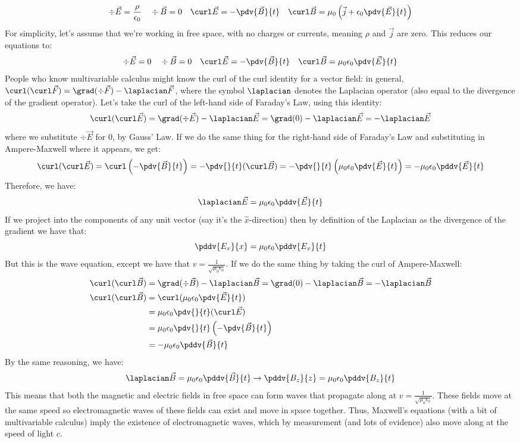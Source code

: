 \[
	\div \vec E = \frac{\rho}{\epsilon_0} \quad \div \vec B = 0 \quad \curl \vec E = -\pdv{\vec B}{t} \quad \curl \vec B = \mu_0 \left(\vec j + \epsilon_0 \pdv{\vec E}{t}\right)
\]
For simplicity, let's assume that we're working in free space, with no charges or currents, meaning $\rho$ and $\vec j$ are zero. This reduces our equations to:
\[
	\div \vec E = 0 \quad \div \vec B = 0 \quad \curl \vec E = -\pdv{\vec B}{t} \quad \curl \vec B = \mu_0\epsilon_0 \pdv{\vec E}{t}
\]
People who know multivariable calculus might know the curl of the curl identity for a vector field: in general, $\curl (\curl \vec F) = \grad(\div \vec F) - \laplacian \vec F$, where the symbol $\laplacian$ denotes the Laplacian operator (also equal to the divergence of the gradient operator). Let's take the curl of the left-hand side of Faraday's Law, using this identity:
\[
	\curl (\curl \vec E) = \grad(\div \vec E) - \laplacian \vec E = \grad (0) - \laplacian \vec E = -\laplacian \vec E
\]
where we substitute $\div \vec E$ for $0$, by Gauss' Law. If we do the same thing for the right-hand side of Faraday's Law and substituting in Ampere-Maxwell where it appears, we get:
\[
	\curl (\curl \vec E) = \curl \left(-\pdv{\vec B}{t}\right) = -\pdv{}{t} (\curl \vec B) = -\pdv{}{t} \left(\mu_0\epsilon_0 \pdv{\vec E}{t} \right) = -\mu_0 \epsilon_0 \pddv{\vec E}{t}
\]
Therefore, we have:
\[
	\laplacian \vec E = \mu_0 \epsilon_0 \pddv{\vec E}{t}
\]
If we project into the components of any unit vector (say it's the $\hat x$-direction) then by definition of the Laplacian as the divergence of the gradient we have that:
\[
	\pddv{E_x}{x} = \mu_0 \epsilon_0 \pddv{E_x}{t}
\]
But this is the wave equation, except we have that $v = \frac{1}{\sqrt{\mu_0 \epsilon_0}}$. If we do the same thing by taking the curl of Ampere-Maxwell: 
\begin{align*}
	\curl (\curl \vec B) &= \grad(\div \vec B) - \laplacian \vec B = \grad (0) - \laplacian \vec B = -\laplacian \vec B \\
	\curl (\curl \vec B) &= \curl (\mu_0 \epsilon_0 \pdv{\vec E}{t}) \\
	&= \mu_0 \epsilon_0 \pdv{}{t} (\curl \vec E) \\
	&= \mu_0 \epsilon_0 \pdv{}{t} \left(-\pdv{\vec B}{t}\right)\\
	&= -\mu_0 \epsilon_0 \pddv{\vec B}{t}
\end{align*}
By the same reasoning, we have:
\[
	\laplacian \vec B = \mu_0 \epsilon_0 \pddv{\vec B}{t} \rightarrow \pddv{B_z}{z} = \mu_0 \epsilon_0 \pddv{B_z}{t}
\]
This means that both the magnetic and electric fields in free space can form waves that propagate along at $v = \frac{1}{\sqrt{\mu_0 \epsilon_0}}$. These fields move at the same speed so electromagnetic waves of these fields can exist and move in space together. Thus, Maxwell's equations (with a bit of multivariable calculus) imply the existence of electromagnetic waves, which by measurement (and lots of evidence) also move along at the speed of light $c$. 
